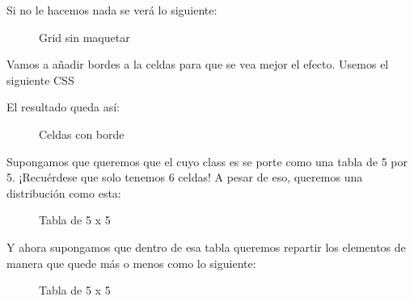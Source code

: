 \documentclass[letterpaper,10pt,spanish]{sphinxmanual}
\begin{document}
Si no le hacemos nada se verá lo siguiente:

\begin{figure}[htbp]
\centering
\capstart

\noindent{}
\caption{Grid sin maquetar}\label{\detokenize{tema3:id8}}\end{figure}

Vamos a añadir bordes a la celdas para que se vea  mejor el efecto. Usemos el siguiente CSS

\begin{sphinxVerbatim}[commandchars=\\\{\}]
               
\end{sphinxVerbatim}

El resultado queda así:

\begin{figure}[htbp]
\centering
\capstart

\noindent{}
\caption{Celdas con borde}\label{\detokenize{tema3:id9}}\end{figure}

Supongamos que queremos que el  cuyo class es  se porte como una tabla de 5 por 5. ¡Recuérdese que
solo tenemos 6 celdas! A pesar de eso, queremos una distribución como esta:

\begin{figure}[htbp]
\centering
\capstart

\noindent{}
\caption{Tabla de 5 x 5}\label{\detokenize{tema3:id10}}\end{figure}

Y ahora supongamos que dentro de esa tabla queremos repartir los elementos de manera que quede más o menos como lo siguiente:

\begin{figure}[htbp]
\centering
\capstart

\noindent{}
\caption{Tabla de 5 x 5}\label{\detokenize{tema3:id11}}\end{figure}
\end{document}
